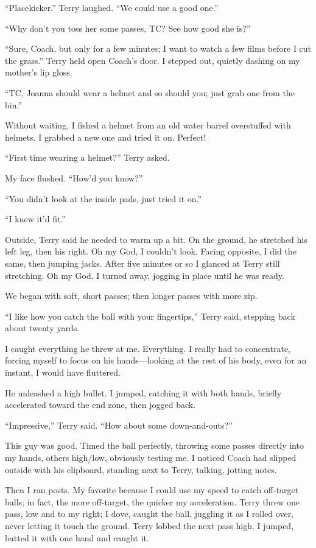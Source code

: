 ``Placekicker.'' Terry laughed. ``We could use a good one.''

``Why don't you toss her some passes, TC? See how good she is?''

``Sure, Coach, but only for a few minutes; I want to watch a few films
before I cut the grass.'' Terry held open Coach's door. I stepped out,
quietly dashing on my mother's lip gloss.

``TC, Joanna should wear a helmet and so should you; just grab one from
the bin.''

Without waiting, I fished a helmet from an old water barrel overstuffed
with helmets. I grabbed a new one and tried it on. Perfect!

``First time wearing a helmet?'' Terry asked.

My face flushed. ``How'd you know?''

``You didn't look at the inside pads, just tried it on.''

``I knew it'd fit.''

Outside, Terry said he needed to warm up a bit. On the ground, he
stretched his left leg, then his right. Oh my God, I couldn't look.
Facing opposite, I did the same, then jumping jacks. After five minutes
or so I glanced at Terry still stretching. Oh my God. I turned away,
jogging in place until he was ready.

We began with soft, short passes; then longer passes with more zip.

``I like how you catch the ball with your fingertips,'' Terry said,
stepping back about twenty yards.

I caught everything he threw at me. Everything. I really had to
concentrate, forcing myself to focus on his hands---looking at the rest
of his body, even for an instant, I would have fluttered.

He unleashed a high bullet. I jumped, catching it with both hands,
briefly accelerated toward the end zone, then jogged back.

``Impressive,'' Terry said. ``How about some down-and-outs?''

This guy was good. Timed the ball perfectly, throwing some passes
directly into my hands, others high/low, obviously testing me. I noticed
Coach had slipped outside with his clipboard, standing next to Terry,
talking, jotting notes.

Then I ran posts. My favorite because I could use my speed to catch
off-target balls; in fact, the more off-target, the quicker my
acceleration. Terry threw one pass, low and to my right; I dove, caught
the ball, juggling it as I rolled over, never letting it touch the
ground. Terry lobbed the next pass high. I jumped, batted it with one
hand and caught it.

